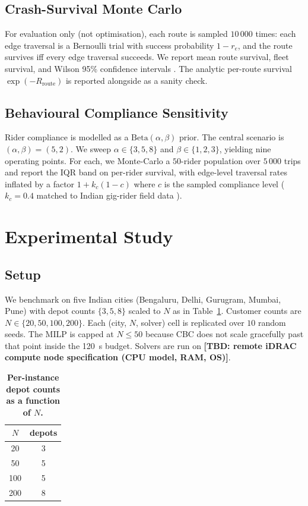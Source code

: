\documentclass{ieeeaccess}
\newcommand{\TBD}[1]{\textbf{[TBD: #1]}}
\begin{document}
\subsection{Crash-Survival Monte Carlo}
For evaluation only (not optimisation), each route is sampled
$10\,000$ times: each edge traversal is a Bernoulli trial with success
probability $1 - r_e$, and the route survives iff every edge
traversal succeeds. We report mean route survival, fleet survival, and
Wilson 95\% confidence intervals \cite{wilson1927}. The analytic per-route survival
$\exp(-R_{\text{route}})$ is reported alongside as a sanity check.

\subsection{Behavioural Compliance Sensitivity}
\label{subsec:behavioural}
Rider compliance is modelled as a
$\mathrm{Beta}(\alpha, \beta)$ prior. The central scenario is
$(\alpha, \beta) = (5, 2)$. We sweep
$\alpha \in \{3, 5, 8\}$ and $\beta \in \{1, 2, 3\}$, yielding nine
operating points. For each, we Monte-Carlo a $50$-rider population over
$5\,000$ trips and report the IQR band on per-rider survival, with
edge-level traversal rates inflated by a factor
$1 + k_c (1 - c)$ where $c$ is the sampled compliance level
($k_c = 0.4$ matched to Indian gig-rider field data
\cite{das2020}).

\section{Experimental Study}
\label{sec:experiments}

\subsection{Setup}
We benchmark on five Indian cities (Bengaluru, Delhi, Gurugram,
Mumbai, Pune) with depot counts $\{3, 5, 8\}$ scaled to $N$ as in
Table~\ref{tab:depot-N}. Customer counts are
$N \in \{20, 50, 100, 200\}$. Each (city, $N$, solver) cell is
replicated over $10$ random seeds. The MILP is capped at $N \leq 50$
because CBC does not scale gracefully past that point inside the
120~s budget. Solvers are run on \TBD{remote iDRAC compute node
specification (CPU model, RAM, OS)}.

\begin{table}
\caption{\textbf{Per-instance depot counts as a function of $N$.}}
\label{tab:depot-N}
\centering
\begin{tabular}{cc}
\toprule
$N$ & depots \\
\midrule
20 & 3 \\
50 & 5 \\
100 & 5 \\
200 & 8 \\
\bottomrule
\end{tabular}
\end{table}
\end{document}
